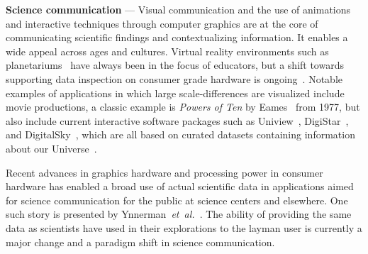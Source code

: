 \documentclass[journal]{vgtc}                %
\newcommand{\etal}{\emph{et~al.}}
\begin{document}

\noindent\textbf{Science communication} ---
Visual communication and the use of animations and interactive techniques through computer graphics are at the core of communicating scientific findings and contextualizing information. It enables a wide appeal across ages and cultures.
Virtual reality environments such as planetariums~\cite{magnor2010progress, liu20013} have always been in the focus of educators, but a shift towards supporting data inspection on consumer grade hardware is ongoing~\cite{nakasone2009astrosim}.
Notable examples of applications in which large scale-differences are visualized include movie productions, a classic example is \emph{Powers of Ten} by Eames~\cite{powersOfTen} from 1977, but also include current interactive software packages such as Uniview~\cite{KHECY10}, DigiStar~\cite{ES16}, and DigitalSky~\cite{Sky16}, which are all based on curated datasets containing information about our Universe~\cite{abbott2006digital}. 

Recent advances in graphics hardware and processing power in consumer hardware has enabled a broad use of actual scientific data in applications aimed for science communication for the public at science centers and elsewhere.
One such story is presented by Ynnerman~\etal~\cite{ynnerman2016interactive}.
The ability of providing the same data as scientists have used in their explorations to the layman user is currently a major change and a paradigm shift in science communication.
\end{document}
